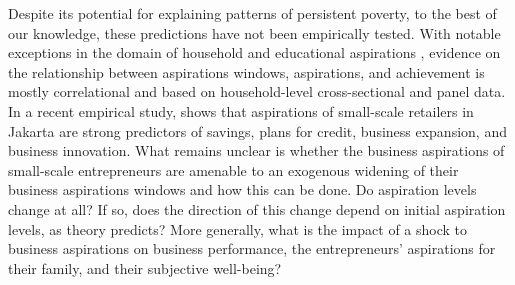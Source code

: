 \documentclass[11.5pt]{article}
\begin{document}



Despite its potential for explaining patterns of persistent poverty, to the best of our knowledge, these predictions have not been empirically tested. With notable exceptions in the domain of household and educational aspirations \citep[see,][]{Bernard2014, Riley2017, Macours2014, Beaman2012}, evidence on the relationship between aspirations windows, aspirations, and achievement is mostly correlational and based on household-level cross-sectional and panel data. In a recent empirical study, \citep{Dalton2018} shows that aspirations of small-scale retailers in Jakarta are strong predictors of savings, plans for credit, business expansion, and business innovation. What remains unclear is whether the business aspirations of small-scale entrepreneurs are amenable to an exogenous widening of their business aspirations windows and how this can be done. Do aspiration levels change at all? If so, does the direction of this change depend on initial aspiration levels, as theory predicts? More generally, what is the impact of a shock to business aspirations on business performance, the entrepreneurs' aspirations for their family, and their subjective well-being? %
\end{document}
